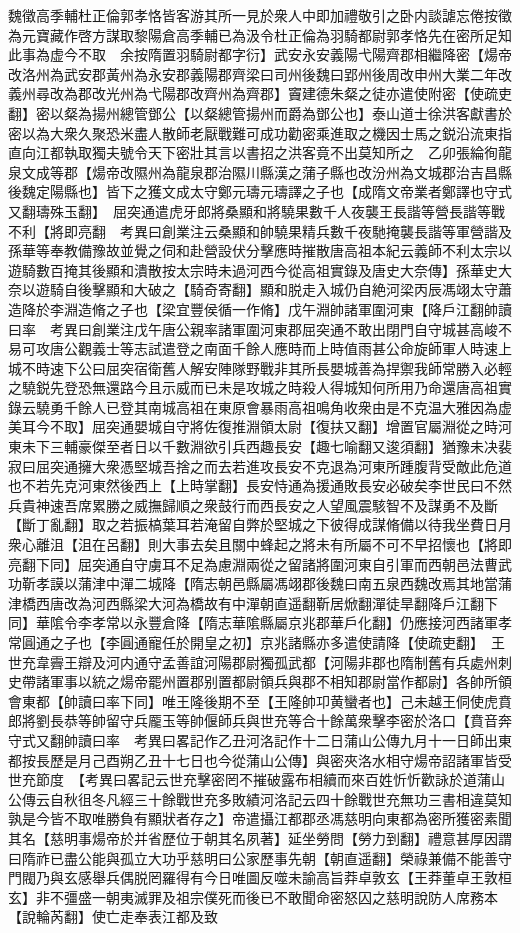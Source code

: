 魏徵高季輔杜正倫郭孝恪皆客游其所一見於衆人中即加禮敬引之卧内談謔忘倦按徵為元寶藏作啓方謀取黎陽倉高季輔已為汲令杜正倫為羽騎都尉郭孝恪先在密所足知此事為虚今不取　余按隋置羽騎尉都字衍】武安永安義陽弋陽齊郡相繼降密【煬帝改洛州為武安郡黃州為永安郡義陽郡齊梁曰司州後魏曰郢州後周改申州大業二年改義州尋改為郡改光州為弋陽郡改齊州為齊郡】竇建德朱粲之徒亦遣使附密【使疏吏翻】密以粲為揚州總管鄧公【以粲總管揚州而爵為鄧公也】泰山道士徐洪客獻書於密以為大衆久聚恐米盡人散師老厭戰難可成功勸密乘進取之機因士馬之鋭沿流東指直向江都執取獨夫號令天下密壯其言以書招之洪客竟不出莫知所之　乙卯張綸徇龍泉文成等郡【煬帝改隰州為龍泉郡治隰川縣漢之蒲子縣也改汾州為文城郡治吉昌縣後魏定陽縣也】皆下之獲文成太守鄭元璹元璹譯之子也【成隋文帝業者鄭譯也守式又翻璹殊玉翻】　屈突通遣虎牙郎將桑顯和將驍果數千人夜襲王長諧等營長諧等戰不利【將即亮翻　考異曰創業注云桑顯和帥驍果精兵數千夜馳掩襲長諧等軍營諧及孫華等奉教備豫故並覺之伺和赴營設伏分擊應時摧散唐高祖本紀云義師不利太宗以遊騎數百掩其後顯和潰散按太宗時未過河西今從高祖實錄及唐史大奈傳】孫華史大奈以遊騎自後擊顯和大破之【騎奇寄翻】顯和脱走入城仍自絶河梁丙辰馮翊太守蕭造降於李淵造脩之子也【梁宜豐侯循一作脩】戊午淵帥諸軍圍河東【降戶江翻帥讀曰率　考異曰創業注戊午唐公親率諸軍圍河東郡屈突通不敢出閉門自守城甚高峻不易可攻唐公觀義士等志試遣登之南面千餘人應時而上時值雨甚公命旋師軍人時速上城不時速下公曰屈突宿衛舊人解安陣隊野戰非其所長嬰城善為捍禦我師常勝入必輕之驍鋭先登恐無還路今且示威而已未是攻城之時殺人得城知何所用乃命還唐高祖實錄云驍勇千餘人已登其南城高祖在東原會暴雨高祖鳴角收衆由是不克温大雅因為虚美耳今不取】屈突通嬰城自守將佐復推淵領太尉【復扶又翻】增置官屬淵從之時河東未下三輔豪傑至者日以千數淵欲引兵西趣長安【趣七喻翻又逡須翻】猶豫未决裴寂曰屈突通擁大衆憑堅城吾捨之而去若進攻長安不克退為河東所踵腹背受敵此危道也不若先克河東然後西上【上時掌翻】長安恃通為援通敗長安必破矣李世民曰不然兵貴神速吾席累勝之威撫歸順之衆鼓行而西長安之人望風震駭智不及謀勇不及斷【斷丁亂翻】取之若振槁葉耳若淹留自弊於堅城之下彼得成謀脩備以待我坐費日月衆心離沮【沮在呂翻】則大事去矣且關中蜂起之將未有所屬不可不早招懷也【將即亮翻下同】屈突通自守虜耳不足為慮淵兩從之留諸將圍河東自引軍而西朝邑法曹武功靳孝謨以蒲津中潬二城降【隋志朝邑縣屬馮翊郡後魏曰南五泉西魏改焉其地當蒲津橋西唐改為河西縣梁大河為橋故有中潬朝直遥翻靳居焮翻潬徒旱翻降戶江翻下同】華隂令李孝常以永豐倉降【隋志華隂縣屬京兆郡華戶化翻】仍應接河西諸軍孝常圓通之子也【李圓通寵任於開皇之初】京兆諸縣亦多遣使請降【使疏吏翻】　王世充韋霽王辯及河内通守孟善誼河陽郡尉獨孤武都【河陽非郡也隋制舊有兵處州刺史帶諸軍事以統之煬帝罷州置郡别置都尉領兵與郡不相知郡尉當作都尉】各帥所領會東都【帥讀曰率下同】唯王隆後期不至【王隆帥卭黄蠻者也】己未越王侗使虎賁郎將劉長恭等帥留守兵龎玉等帥偃師兵與世充等合十餘萬衆擊李密於洛口【賁音奔守式又翻帥讀曰率　考異曰畧記作乙丑河洛記作十二日蒲山公傳九月十一日師出東都按長歷是月己酉朔乙丑十七日也今從蒲山公傳】與密夾洛水相守煬帝詔諸軍皆受世充節度　【考異曰畧記云世充擊密罔不摧破露布相續而來百姓忻忻歡詠於道蒲山公傳云自秋徂冬凡經三十餘戰世充多敗績河洛記云四十餘戰世充無功三書相違莫知孰是今皆不取唯勝負有顯狀者存之】帝遣攝江都郡丞馮慈明向東都為密所獲密素聞其名【慈明事煬帝於并省歷位于朝其名夙著】延坐勞問【勞力到翻】禮意甚厚因謂曰隋祚已盡公能與孤立大功乎慈明曰公家歷事先朝【朝直遥翻】榮祿兼備不能善守門閥乃與玄感舉兵偶脱罔羅得有今日唯圖反噬未諭高旨莽卓敦玄【王莽董卓王敦桓玄】非不彊盛一朝夷滅罪及祖宗僕死而後已不敢聞命密怒囚之慈明說防人席務本【說輪芮翻】使亡走奉表江都及致